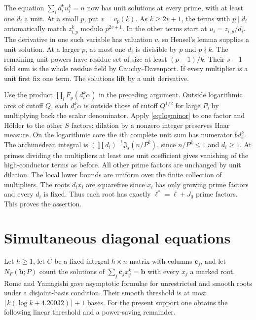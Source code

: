 \documentclass[11pt,letterpaper]{article}
\theoremstyle{definition}
\newcommand{\Ji}{\mathfrak J}
\begin{document}
The equation $\sum_i d_i^k u_i^k=n$ now has unit solutions at every
prime, with at least one $d_i$ a unit. At a small $p$, put
$v=v_p(k)$. As $k\ge2v+1$, the terms with $p\mid d_i$ automatically
match $z_{i,p}^k$ modulo $p^{2v+1}$. In the other terms start at
$u_i=z_{i,p}/d_i$. The derivative in one such variable has valuation
$v$, so Hensel's lemma supplies a unit solution. At a larger $p$, at
most one $d_i$ is divisible by $p$ and $p\nmid k$. The remaining
unit powers have residue set of size at least $(p-1)/k$. Their
$s-1$-fold sum is the whole residue field by Cauchy--Davenport.
If every multiplier is a unit first fix one term. The solutions lift
by a unit derivative.

Use the product $\prod_i F_{\mathrm p}(d_i^k\alpha)$ in the preceding
argument. Outside logarithmic arcs of cutoff $Q$, each $d_i^k\alpha$
is outside those of cutoff $Q^{1/2}$ for large $P$, by multiplying
back the scalar denominator. Apply \eqref{eq:logminor} to one factor
and H\"older to the other $S$ factors: dilation by a nonzero integer
preserves Haar measure. On the logarithmic core the $i$th complete
unit sum has numerator $b d_i^k$. The archimedean integral is
$(\prod d_i)^{-1}\Ji_s(n/P^k)$, since $n/P^k\le1$ and $d_i\ge1$.
At primes dividing the multipliers at least one unit coefficient
gives vanishing of the high-conductor terms as before. All other
prime factors are unchanged by unit dilation. The local lower bounds
are uniform over the finite collection of multipliers.
The roots $d_i x_i$ are squarefree since $x_i$ has only growing prime
factors and every $d_i$ is fixed. Thus each root has exactly
$\ell^*=\ell+J_0$ prime factors. This proves the assertion.

\section{Simultaneous diagonal equations}\label{sec:systems}
Let $h\ge1$, let $C$ be a fixed integral $h\times n$ matrix with
columns $\mathbf c_j$, and let $N_F(\mathbf b;P)$ count the solutions
of $\sum_j\mathbf c_j x_j^k=\mathbf b$ with every $x_j$ a marked
root. Rome and Yamagishi \cite[Theorems 1.4, 1.5 and Remark 1.6]{RY}
gave asymptotic formulae for unrestricted and smooth roots under a
disjoint-basis condition. Their smooth threshold is at most
$\lceil k(\log k+4.20032)\rceil+1$ bases. For the present support
one obtains the following linear threshold and a power-saving remainder.
\end{document}
